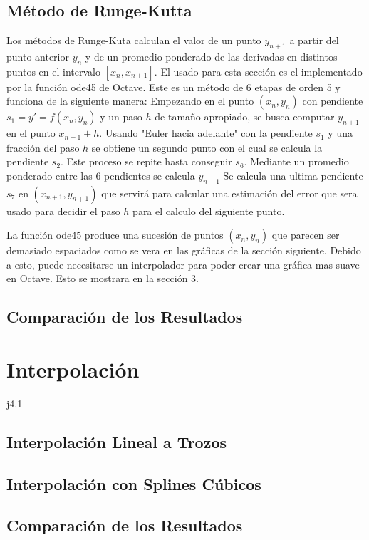 \documentclass{endm}
\begin{document}
\subsection{Método de Runge-Kutta}
Los métodos de Runge-Kuta calculan el valor de un punto $y_{n+1}$ a partir del punto anterior $y_n$ y de
un promedio ponderado de las derivadas en distintos puntos en el intervalo $[x_n, x_{n+1}]$.
El usado para esta sección es el implementado por la función ode45 de Octave.
Este es un método de 6 etapas de orden 5 y funciona de la siguiente manera:
Empezando en el punto $(x_n,y_n)$ con pendiente $s_1 = y' = f(x_n,y_n)$ y un paso $h$ de tamaño apropiado,
se busca computar $y_{n+1}$ en el punto $x_{n+1} + h$.
Usando "Euler hacia adelante" con la pendiente $s_1$ y una fracción del paso $h$ se obtiene un segundo punto
con el cual se calcula la pendiente $s_2$. Este proceso se repite hasta conseguir $s_6$.
Mediante un promedio ponderado entre las 6 pendientes se calcula $y_{n+1}$
Se calcula una ultima pendiente $s_7$ en $(x_{n+1},y_{n+1})$ que servirá para calcular una estimación
del error que sera usado para decidir el paso $h$ para el calculo del siguiente punto.

La función ode45 produce una sucesión de puntos $(x_n,y_n)$ que parecen ser demasiado espaciados como se vera
en las gráficas de la sección siguiente. Debido a esto, puede necesitarse un interpolador para poder crear una
gráfica mas suave en Octave. Esto se mostrara en la sección 3.

\subsection{Comparación de los Resultados}


\section{Interpolación}
 j4.1
\subsection{Interpolación Lineal a Trozos}


\subsection{Interpolación con Splines Cúbicos}


\subsection{Comparación de los Resultados}


\clearpage
\printbibliography
\end{document}
